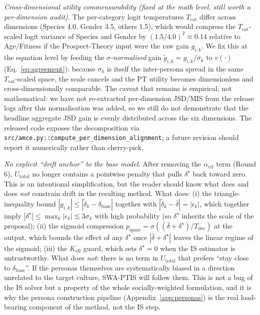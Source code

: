 \documentclass{article}
\begin{document}
\emph{Cross-dimensional utility commensurability (fixed at the math level,
still worth a per-dimension audit).} The per-category logit temperatures
$T_{\text{cat}}$ differ across dimensions (Species 4.0, Gender 3.5, others
1.5), which would compress the $T_{\text{cat}}$-scaled logit variance of
Species and Gender by $(1.5/4.0)^{2}\approx 0.14$ relative to Age/Fitness
if the Prospect-Theory input were the raw gain $g_{i,k}$. We fix this at
the equation level by feeding the \emph{$\sigma$-normalised} gain
$\tilde{g}_{i,k}=g_{i,k}/\sigma_k$ to $v(\cdot)$
(Eq.~\ref{eq:agreement}): because $\sigma_k$ is itself the inter-persona
spread in the same $T_{\text{cat}}$-scaled space, the scale cancels and
the PT utility becomes dimensionless and cross-dimensionally comparable.
The caveat that remains is empirical, not mathematical: we have not
re-extracted per-dimension JSD/MIS from the release logs after this
normalisation was added, so we still do not demonstrate that the headline
aggregate JSD gain is evenly distributed across the six dimensions. The
released code exposes the decomposition via
\texttt{src/amce.py::compute\_per\_dimension\_alignment}; a future
revision should report it numerically rather than cherry-pick.

\emph{No explicit ``drift anchor'' to the base model.} After removing the
$\alpha_{\text{ctl}}$ term (Round 6), $U_{\text{total}}$ no longer contains a
pointwise penalty that pulls $\delta^{\star}$ back toward zero. This is an
intentional simplification, but the reader should know what does and does
\emph{not} constrain drift in the resulting method. What does: (i) the
triangle-inequality bound $|g_{i,k}|\le|\tilde{\delta}_k-\delta_{\text{base}}|$
together with $|\tilde{\delta}_k-\bar{\delta}|=|\epsilon_k|$, which together
imply $|\delta^{\star}|\le\max_k|\epsilon_k|\lesssim 3\sigma_k$ with high
probability (so $\delta^{\star}$ inherits the scale of the proposal);
(ii) the sigmoid compression
$p_{\text{spare}}=\sigma((\bar{\delta}+\delta^{\star})/T_{\text{dec}})$ at
the output, which bounds the effect of any $\delta^{\star}$ once
$|\bar{\delta}+\delta^{\star}|$ leaves the linear regime of the sigmoid;
(iii) the $K_{\text{eff}}$ guard, which sets $\delta^{\star}=0$ when the IS
estimator is untrustworthy. What does \emph{not}: there is no term in
$U_{\text{total}}$ that prefers ``stay close to $\delta_{\text{base}}$''.
If the personas themselves are systematically biased in a direction
unrelated to the target culture, SWA-PTIS will follow them. This is not a
bug of the IS solver but a property of the whole socially-weighted
formulation, and it is why the persona construction pipeline
(Appendix~\ref{app:personas}) is the real load-bearing component of the
method, not the IS step.
\end{document}
